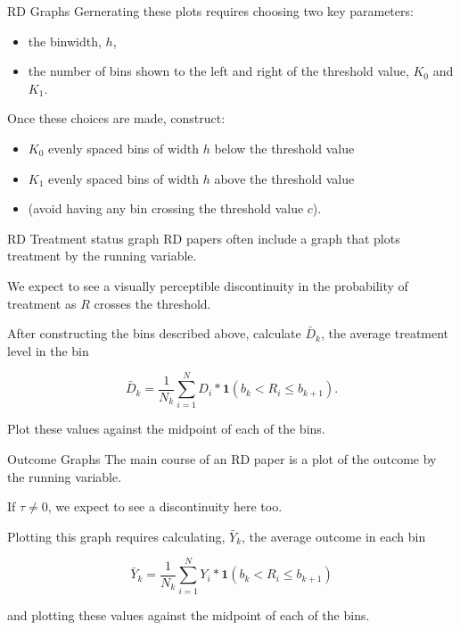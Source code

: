 \documentclass[
  ignorenonframetext,
]{beamer}
\begin{document}
\begin{frame}{RD Graphs}
\protect\hypertarget{rd-graphs-2}{}
Gernerating these plots requires choosing two key parameters:

\begin{itemize}
\item
  the binwidth, \(h\),
\item
  the number of bins shown to the left and right of the threshold value,
  \(K_0\) and \(K_1\).
\end{itemize}

Once these choices are made, construct:

\begin{itemize}
\item
  \(K_0\) evenly spaced bins of width \(h\) below the threshold value
\item
  \(K_1\) evenly spaced bins of width \(h\) above the threshold value
\item
  (avoid having any bin crossing the threshold value \(c\)).
\end{itemize}
\end{frame}

\begin{frame}{RD Treatment status graph}
\protect\hypertarget{rd-treatment-status-graph}{}
RD papers often include a graph that plots treatment by the running
variable.

We expect to see a visually perceptible discontinuity in the probability
of treatment as \(R\) crosses the threshold.

After constructing the bins described above, calculate \(\bar{D}_k\),
the average treatment level in the bin

\[
\bar{D}_k=\frac{1}{N_k}\sum_{i=1}^ND_i*\mathbf{1}(b_k<R_i\leq b_{k+1}).
\]

Plot these values against the midpoint of each of the bins.
\end{frame}

\begin{frame}{Outcome Graphs}
\protect\hypertarget{outcome-graphs}{}
The main course of an RD paper is a plot of the outcome by the running
variable.

If \(\tau\neq0\), we expect to see a discontinuity here too.

Plotting this graph requires calculating, \(\bar{Y}_k\), the average
outcome in each bin

\[
\bar{Y}_k=\frac{1}{N_k}\sum_{i=1}^NY_i*\mathbf{1}(b_k<R_i\leq b_{k+1})
\]

and plotting these values against the midpoint of each of the bins.
\end{frame}
\end{document}
